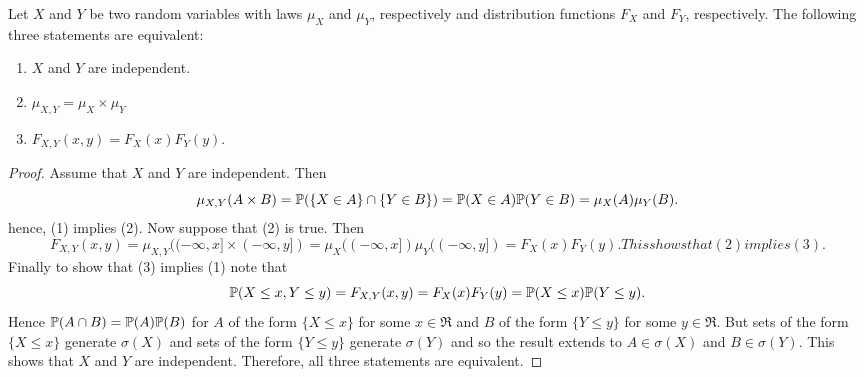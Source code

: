 \begin{theorem}
Let $X$ and $Y$ be two random variables with laws $\mu_X$ and $\mu_Y$, respectively and distribution functions $F_X$ and $F_Y$, respectively. The following three statements are equivalent:
\begin{enumerate}
\item $X$ and $Y$ are independent.
\item $\mu_{X,Y}=\mu_X\times \mu_Y$
\item $F_{X,Y}(x,y)=F_X(x)F_Y(y)$.
\end{enumerate}
\end{theorem}




\begin{proof}
Assume that $X$ and $Y$ are independent. Then
\begin{equation*}
\mu_{X,Y}(A\times B)=\mathbb P(\{X\in A\}\cap \{Y\in B \})=\mathbb P(X\in A)\mathbb P(Y\in B)=\mu_X(A)\mu_Y(B).
\end{equation*}
hence, (1) implies (2). Now suppose that (2) is true. Then
\begin{equation*}
F_{X,Y}(x,y)=\mu_{X,Y}((-\infty,x]\times(-\infty, y])=\mu_X((-\infty, x])\mu_Y((-\infty, y])=F_X(x)F_Y(y). This shows that (2) implies (3).
\end{equation*}
Finally to show that (3) implies (1) note that
\begin{equation*}
\mathbb P(X\leq x,Y\leq y)=F_{X,Y}(x,y)=F_X(x)F_Y(y)=\mathbb P(X\leq x)\mathbb P(Y\leq y).
\end{equation*}
Hence $\mathbb P(A\cap B)=\mathbb P(A)\mathbb P(B)$ for $A$ of the form $\{X\leq x \}$ for 
some $x\in \Re$ and $B$ of the form $\{Y\leq y \}$ for some $y\in \Re$. But sets of the form $\{X\leq x \}$ generate $\sigma(X)$ and sets of the form $\{Y\leq y \}$ generate $\sigma(Y)$ and so the result extends to $A\in\sigma(X)$ and $B\in\sigma(Y)$. This shows that $X$ and $Y$ are independent. Therefore, all three 
statements are equivalent.
\end{proof}